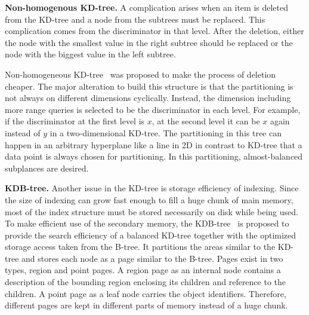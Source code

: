 \documentclass[a4paper,12pt]{article}
\begin{document}
\textbf{Non-homogenous KD-tree.}
A complication arises when an item is deleted from the KD-tree and a node from the subtrees must be replaced. This complication comes from the discriminator in that level. After the deletion, either the node with the smallest value in the right subtree should be replaced or the node with the biggest value in the left subtree. 

Non-homogeneous KD-tree~\cite{nonhomkdtree} was proposed to make the process of deletion cheaper. The major alteration to build this structure is that the partitioning is not always on different dimensions cyclically. Instead, the dimension including more range queries is selected to be the discriminator in each level. For example, if the discriminator at the first level is $x$, at the second level it can be $x$ again instead of $y$ in a two-dimensional KD-tree. 
The partitioning in this tree can happen in an arbitrary hyperplane like a line in 2D in contrast to KD-tree that a data point is always chosen for partitioning. In this partitioning, almost-balanced subplances are desired.
 
\textbf{KDB-tree.} Another issue in the KD-tree is storage efficiency of indexing.
Since the size of indexing can grow fast enough to fill a huge chunk of main memory, most of the index structure must be stored necessarily on disk while being used.
To make efficient use of the secondary memory, the KDB-tree~\cite{kdbtree} is proposed to provide the search efficiency of a balanced KD-tree together with the optimized storage access taken from the B-tree. It partitions the areas similar to the KD-tree and stores each node as a page similar to the B-tree. Pages exist in two types, 
region and point pages. A region page as an internal node contains a description of the bounding region enclosing its children and reference to the children. 
A point page as a leaf node carries the object identifiers. Therefore, different pages are kept in different parts of memory instead of a huge chunk. 
\end{document}
